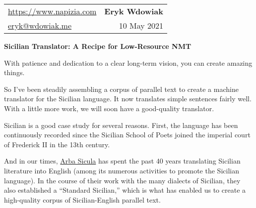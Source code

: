 \documentclass[10pt,letterpaper]{article}
\begin{document}

\thispagestyle{empty}

\hypertarget{intro}{}


\begin{tabularx}{\textwidth}{X r}
  \href{https://www.napizia.com}{https://www.napizia.com}    &  \large{\textbf{Eryk Wdowiak}}\\
  \href{mailto:eryk@wdowiak.me}{eryk@wdowiak.me}  &  10 May 2021
\end{tabularx}


\begin{center}
  \Large{\textbf{Sicilian Translator: %
  A Recipe for Low-Resource NMT}}
\end{center}



With patience and dedication to a clear long-term vision, you can create amazing things.

So I've been steadily assembling a corpus of parallel text to create a machine translator for the Sicilian language. 
It now translates simple sentences fairly well. With a little more work, we will soon have a good-quality translator.

Sicilian is a good case study for several reasons. First, the language has been continuously recorded since the 
Sicilian School of Poets joined the imperial court of Frederick II in the 13th century.

And in our times, \href{https://www.arbasicula.org/}{Arba Sicula}
has spent the past 40 years translating Sicilian literature into English
(among its numerous activities to promote the Sicilian language).
In the course of their work with the many dialects of Sicilian, they also established a ``Standard Sicilian,''
which is what has enabled us to create a high-quality corpus of Sicilian-English parallel text.
\end{document}
